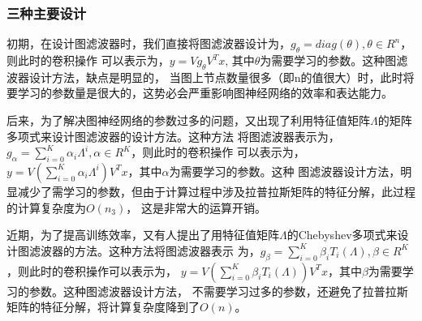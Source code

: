 \subsubsection{三种主要设计}
初期，在设计图滤波器时，我们直接将图滤波器设计为，$ g_{\theta} = diag(\theta),\theta \in R^n $，则此时的卷积操作
可以表示为，$ y = V g_{\theta} V^{T} x $, 其中$ \theta $为需要学习的参数。这种图滤波器设计方法，缺点是明显的，
当图上节点数量很多（即n的值很大）时，此时将要学习的参数量是很大的，这势必会严重影响图神经网络的效率和表达能力。

后来，为了解决图神经网络的参数过多的问题，又出现了利用特征值矩阵$ \Lambda $的矩阵多项式来设计图滤波器的设计方法。这种方法
将图滤波器表示为，$ g_{\alpha} = {\sum_{i=0}^{K}} \alpha_{i} \Lambda^{i},  \alpha \in R^K $，则此时的卷积操作
可以表示为，$ y = V ({\sum_{i=0}^{K}} \alpha_{i} \Lambda^{i}) V^{T} x $，其中$ \alpha $为需要学习的参数。这种
图滤波器设计方法，明显减少了需学习的参数，但由于计算过程中涉及拉普拉斯矩阵的特征分解，此过程的计算复杂度为$ O(n_{3}) $，
这是非常大的运算开销。

近期，为了提高训练效率，又有人提出了用特征值矩阵$ \Lambda $的Chebyshev多项式来设计图滤波器的方法。这种方法将图滤波器表示
为，$ g_{\beta} = {\sum_{i=0}^{K}} \beta_{i} T_{i}(\Lambda),  \beta \in R^K $，则此时的卷积操作可以表示为，
$ y = V ({\sum_{i=0}^{K}} \beta_{i} T_{i}(\Lambda)) V^{T} x $，其中$ \beta $为需要学习的参数。这种图滤波器设计方法，
不需要学习过多的参数，还避免了拉普拉斯矩阵的特征分解，将计算复杂度降到了$ O(n) $。

